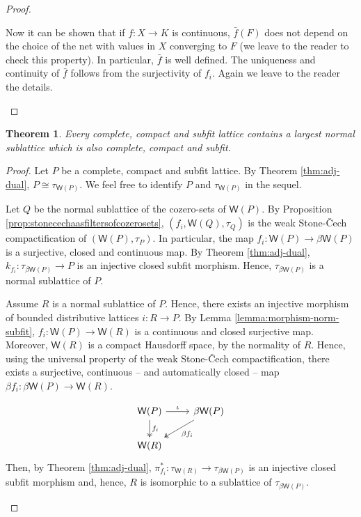 \documentclass{article}
\newcommand{\corn}[1]{(\mathsf{W}(#1),\tau_{#1})}
\theoremstyle{plain}
\newtheorem{theorem}{Theorem}[subsection]
\theoremstyle{definition}
\theoremstyle{remark}
\newcommand{\0}{\mathbbm 0}
\newcommand{\1}{\mathbbm 1}
\newcommand{\2}{\mathbbm 2}
\begin{document}
\begin{proof}
\begin{description}[font=\normalfont\itshape]
Now it can be shown that if $f:X\to K$ is continuous, $\bar{f}(F)$ does not depend on the choice of the net with values in $X$ converging to $F$ (we leave to the reader to check this property). In particular, $\bar{f}$ is well defined. The uniqueness and continuity of $\bar{f}$ follows from the surjectivity of $f_i$. Again we leave to the reader the details.  
\end{description}
\end{proof}



\begin{theorem}
\label{thm:stonecech-lattices}
   Every  complete, compact and subfit lattice contains a largest normal sublattice which is also complete, compact and subfit. 
\end{theorem}




\begin{proof}
    Let $P$ be a complete, compact and subfit lattice. By Theorem \ref{thm:adj-dual}, $P \cong \tau_{\mathsf{W}(P)}$. We feel free to identify $P$ and $ \tau_{\mathsf{W}(P)}$ in the sequel.
    
\begin{description}[font=\normalfont\itshape]

\item[Existence.] Let $Q$ be the normal sublattice of the cozero-sets of $\mathsf{W}(P)$. By Proposition \ref{prop:stonecechaasfiltersofcozerosets}, $(f_i, \mathsf{W}(Q), \tau_Q)$ is the weak Stone-\v{C}ech compactification of $\corn{P}$. In particular, the map $f_i: \mathsf{W}(P) \to \beta \mathsf{W}(P)$ is a surjective, closed and continuous map. By Theorem \ref{thm:adj-dual}, $k_{f_i}: \tau_{\beta \mathsf{W}(P)} \to P$ is an injective closed subfit morphism. Hence, $\tau_{\beta \mathsf{W}(P)}$ is a normal sublattice of $P$. 
        
        \item[Maximality.]
Assume $R$ is a normal sublattice of $P$. Hence, there exists an injective morphism of bounded distributive lattices $i: R \to P$. By Lemma \ref{lemma:morphism-norm-subfit}, $f_i: \mathsf{W}(P) \to \mathsf{W}(R)$ is a continuous and closed surjective map. 
        Moreover, $\mathsf{W}(R)$ is a compact Hausdorff space, by the normality of $R$. Hence, using the universal property of the weak Stone-\v{C}ech compactification, there exists a surjective, continuous -- and automatically closed -- map $\beta f_i :\beta \mathsf{W}(P) \to \mathsf{W}(R) $. 
        
        \[
\begin{tikzcd}
\mathsf{W}(P) \arrow[r,  "\iota"] \arrow[d, "f_i",two heads] & \beta \mathsf{W}(P) \arrow[dl,  "\beta f_i",two heads] \\
\mathsf{W}(R) &
\end{tikzcd}
\]
Then, by Theorem \ref{thm:adj-dual}, $\pi^*_{f_i}:\tau_{\mathsf{W}(R)} \to \tau_{\beta \mathsf{W}(P)} $ is an injective closed subfit morphism and, hence, $R$ is isomorphic to a sublattice of $\tau_{\beta \mathsf{W}(P)}$. 
        \end{description}
\end{proof}
\end{document}
